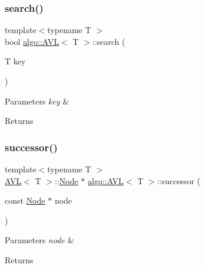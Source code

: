 \subsubsection{\texorpdfstring{search()}{search()}}
{\footnotesize\ttfamily template$<$typename T $>$ \\
bool \hyperlink{classalgo_1_1_a_v_l}{algo\+::\+A\+VL}$<$ T $>$\+::search (\begin{DoxyParamCaption}\item[{T}]{key }\end{DoxyParamCaption})}


\begin{DoxyParams}{Parameters}
{\em key} & \\
\hline
\end{DoxyParams}
\begin{DoxyReturn}{Returns}

\end{DoxyReturn}
\mbox{\label{classalgo_1_1_a_v_l_a51fbd8745d249bbbe17c2f4bd2ad7b7d}} 
\subsubsection{\texorpdfstring{successor()}{successor()}}
{\footnotesize\ttfamily template$<$typename T $>$ \\
\hyperlink{classalgo_1_1_a_v_l}{A\+VL}$<$ T $>$\+::\hyperlink{structalgo_1_1_a_v_l_1_1_node}{Node} $\ast$ \hyperlink{classalgo_1_1_a_v_l}{algo\+::\+A\+VL}$<$ T $>$\+::successor (\begin{DoxyParamCaption}\item[{const \hyperlink{structalgo_1_1_a_v_l_1_1_node}{Node} $\ast$}]{node }\end{DoxyParamCaption})}


\begin{DoxyParams}{Parameters}
{\em node} & \\
\hline
\end{DoxyParams}
\begin{DoxyReturn}{Returns}

\end{DoxyReturn}
\mbox{\label{classalgo_1_1_a_v_l_a9ba6eb96ef53afb440feaf4b689f298a}} 
